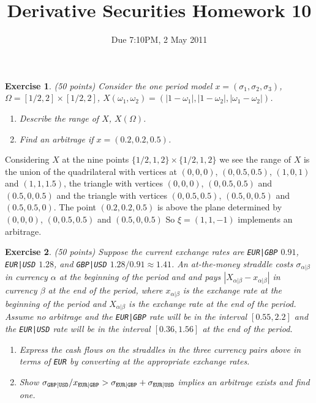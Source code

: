 \documentclass[11pt,fleqn]{amsproc}
\newtheorem{xca}{Exercise}
\begin{document}
\title{Derivative Securities Homework 10}
\author{Due 7:10PM, 2 May 2011}

\maketitle

\begin{xca}{(50 points)}
Consider the one period model $x = (\sigma_1, \sigma_2, \sigma_3)$,
$\Omega = [1/2,2] \times [1/2, 2]$, $X(\omega_1, \omega_2)
= (|1 - \omega_1|, |1 - \omega_2|, |\omega_1 - \omega_2|)$.
\begin{enumerate}
\item Describe the range of $X$, $X(\Omega)$.
\item Find an arbitrage if $x = (0.2, 0.2, 0.5)$.
\end{enumerate}
\end{xca}

Considering $X$ at the nine points $\{1/2,1,2\}\times\{1/2,1,2\}$ we
see the range of $X$ is the union of the quadrilateral with vertices at
$(0,0,0)$, $(0,0.5,0.5)$, $(1, 0, 1)$ and $(1, 1, 1.5)$, the triangle
with vertices $(0,0,0)$, $(0,0.5,0.5)$ and $(0.5,0,0.5)$ and the triangle
with vertices $(0,0.5,0.5)$, $(0.5,0,0.5)$ and  $(0.5,0.5,0)$.  The point
$(0.2,0.2,0.5)$ is above the plane determined by  $(0,0,0)$, $(0,0.5,0.5)$
and $(0.5,0,0.5)$ So $\xi = (1, 1, -1)$ implements an arbitrage.

\begin{xca}{(50 points)}
Suppose the current exchange rates are {\small\tt EUR|GBP} $0.91$,
{\small\tt EUR|USD} $1.28$, and {\small\tt GBP|USD} $1.28/0.91 \approx
1.41$. An at-the-money straddle costs $\sigma_{\alpha|\beta}$ in currency
$\alpha$ at the beginning of the period and and pays $|X_{\alpha|\beta}
- x_{\alpha|\beta}|$ in currency $\beta$ at the end of the period,
where $x_{\alpha|\beta}$ is the exchange rate at the beginning of the
period and $X_{\alpha|\beta}$ is the exchange rate at the end of the
period. Assume no arbitrage and the {\small\tt EUR|GBP} rate will be in
the interval $[0.55, 2.2]$ and the {\small\tt EUR|USD} rate will be in
the interval $[0.36, 1.56]$ at the end of the period.
\begin{enumerate}
\item Express the cash flows on the straddles in the three currency
pairs above in terms of {\small\tt EUR} by converting at the appropriate
exchange rates.
\item Show $\sigma_{\tt GBP|USD}/x_{\tt EUR|GBP} > \sigma_{\tt EUR|GBP}
+ \sigma_{\tt EUR|USD}$ implies an arbitrage exists and find one.
\end{enumerate}
\end{xca}
\end{document}
